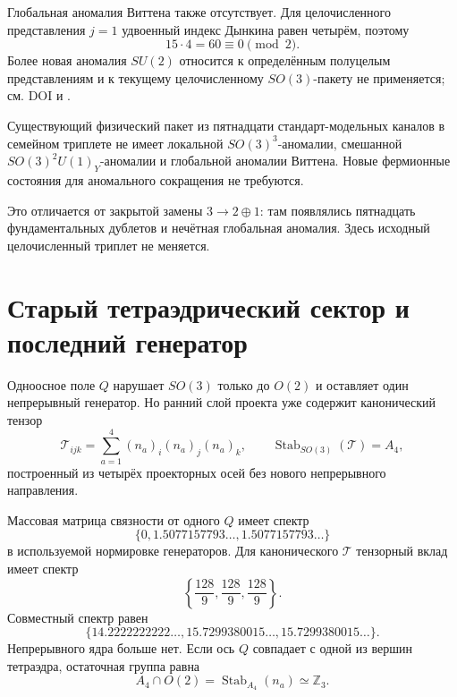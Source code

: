 Глобальная аномалия Виттена также отсутствует. Для целочисленного
представления $j=1$ удвоенный индекс Дынкина равен четырём, поэтому
\begin{equation}
 15\cdot4=60\equiv0\pmod2.
\end{equation}
Более новая аномалия $SU(2)$ относится к определённым полуцелым
представлениям и к текущему целочисленному $SO(3)$-пакету не применяется;
см. DOI  и
.

\begin{theorem}
Существующий физический пакет из пятнадцати стандарт-модельных каналов в
семейном триплете не имеет локальной $SO(3)^3$-аномалии, смешанной
$SO(3)^2U(1)_Y$-аномалии и глобальной аномалии Виттена. Новые фермионные
состояния для аномального сокращения не требуются.
\end{theorem}

Это отличается от закрытой замены $3\to2\oplus1$: там появлялись
пятнадцать фундаментальных дублетов и нечётная глобальная аномалия. Здесь
исходный целочисленный триплет не меняется.

\section{Старый тетраэдрический сектор и последний генератор}

Одноосное поле $Q$ нарушает $SO(3)$ только до $O(2)$ и оставляет один
непрерывный генератор. Но ранний слой проекта уже содержит канонический
тензор
\begin{equation}
 \mathcal T_{ijk}=\sum_{a=1}^4(n_a)_i(n_a)_j(n_a)_k,
 \qquad
 \operatorname{Stab}_{SO(3)}(\mathcal T)=A_4,
 \label{eq:v6-family-tetrahedral-tensor}
\end{equation}
построенный из четырёх проекторных осей без нового непрерывного
направления.

Массовая матрица связности от одного $Q$ имеет спектр
\begin{equation}
 \{0,1.5077157793\ldots,1.5077157793\ldots\}
\end{equation}
в используемой нормировке генераторов. Для канонического
$\mathcal T$ тензорный вклад имеет спектр
\begin{equation}
 \left\{\frac{128}{9},\frac{128}{9},\frac{128}{9}\right\}.
\end{equation}
Совместный спектр равен
\begin{equation}
 \{14.2222222222\ldots,
 15.7299380015\ldots,
 15.7299380015\ldots\}.
 \label{eq:v6-family-combined-gauge-mass-map}
\end{equation}
Непрерывного ядра больше нет. Если ось $Q$ совпадает с одной из вершин
тетраэдра, остаточная группа равна
\begin{equation}
 A_4\cap O(2)=\operatorname{Stab}_{A_4}(n_a)\simeq\mathbb Z_3.
\end{equation}

